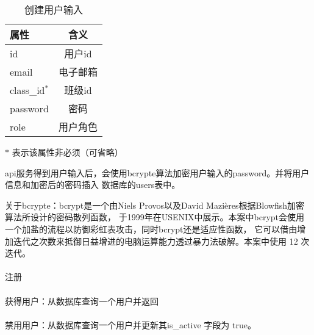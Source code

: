 \begin{table}[htpb!]
    \centering
    \caption{\label{user_in}创建用户输入}
    \begin{threeparttable}
        \begin{tabular}{lc}
            \toprule
            属性          & 含义     \\
            \midrule
            id            & 用户id   \\
            email         & 电子邮箱 \\
            class\_id$^*$ & 班级id   \\
            password      & 密码     \\
            role          & 用户角色 \\
            \bottomrule
        \end{tabular}
        \begin{tablenotes}
            \footnotesize
            \item[$*$] 表示该属性非必须（可省略）
        \end{tablenotes}
    \end{threeparttable}
\end{table}

api服务得到用户输入后，会使用bcrypte算法加密用户输入的password。并将用户信息和加密后的密码插入
数据库的users表中。

关于bcrypte：bcrypt是一个由Niels Provos以及David Mazières根据Blowfish加密算法所设计的密码散列函数，
于1999年在USENIX中展示\cite{bycrypto}。本案中bcrypt会使用一个加盐的流程以防御彩虹表攻击，同时bcrypt还是适应性函数，
它可以借由增加迭代之次数来抵御日益增进的电脑运算能力透过暴力法破解。本案中使用 12 次迭代。

\paragraph{}注册

\paragraph{}获得用户：从数据库查询一个用户并返回

\paragraph{}禁用用户：从数据库查询一个用户并更新其is\_active 字段为 true。